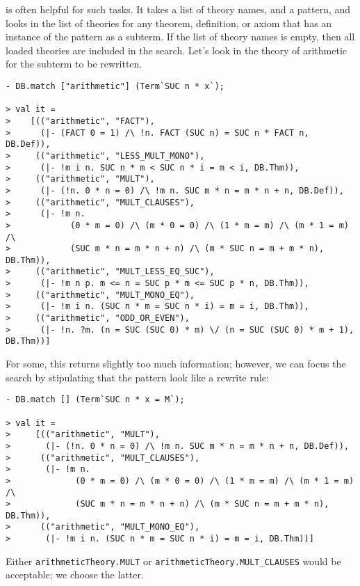 \noindent
is often helpful for such tasks. It takes a list of theory names, and
a pattern, and looks in the list of theories for any theorem,
definition, or axiom that has an instance of the pattern as a subterm.
If the list of theory names is empty, then all loaded theories are
included in the search. Let's look in the theory of arithmetic for the
subterm to be rewritten.

\begin{session}\begin{verbatim}
- DB.match ["arithmetic"] (Term`SUC n * x`);

> val it =
>    [(("arithmetic", "FACT"),
>      (|- (FACT 0 = 1) /\ !n. FACT (SUC n) = SUC n * FACT n, DB.Def)),
>     (("arithmetic", "LESS_MULT_MONO"),
>      (|- !m i n. SUC n * m < SUC n * i = m < i, DB.Thm)),
>     (("arithmetic", "MULT"),
>      (|- (!n. 0 * n = 0) /\ !m n. SUC m * n = m * n + n, DB.Def)),
>     (("arithmetic", "MULT_CLAUSES"),
>      (|- !m n.
>            (0 * m = 0) /\ (m * 0 = 0) /\ (1 * m = m) /\ (m * 1 = m) /\
>            (SUC m * n = m * n + n) /\ (m * SUC n = m + m * n), DB.Thm)),
>     (("arithmetic", "MULT_LESS_EQ_SUC"),
>      (|- !m n p. m <= n = SUC p * m <= SUC p * n, DB.Thm)),
>     (("arithmetic", "MULT_MONO_EQ"),
>      (|- !m i n. (SUC n * m = SUC n * i) = m = i, DB.Thm)),
>     (("arithmetic", "ODD_OR_EVEN"),
>      (|- !n. ?m. (n = SUC (SUC 0) * m) \/ (n = SUC (SUC 0) * m + 1), DB.Thm))]
\end{verbatim}\end{session}

For some, this returns slightly too much information; however, we can
focus the search by stipulating that the pattern look like a rewrite
rule:

\begin{session}\begin{verbatim}
- DB.match [] (Term`SUC n * x = M`);

> val it =
>     [(("arithmetic", "MULT"),
>       (|- (!n. 0 * n = 0) /\ !m n. SUC m * n = m * n + n, DB.Def)),
>      (("arithmetic", "MULT_CLAUSES"),
>       (|- !m n.
>             (0 * m = 0) /\ (m * 0 = 0) /\ (1 * m = m) /\ (m * 1 = m) /\
>             (SUC m * n = m * n + n) /\ (m * SUC n = m + m * n), DB.Thm)),
>      (("arithmetic", "MULT_MONO_EQ"),
>       (|- !m i n. (SUC n * m = SUC n * i) = m = i, DB.Thm))]
\end{verbatim}\end{session}

Either {\small\verb+arithmeticTheory.MULT+} or
{\small\verb+arithmeticTheory.MULT_CLAUSES+} would be acceptable; we
choose the latter.

